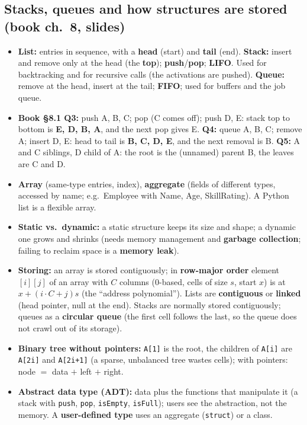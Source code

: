 \documentclass{fkt-notes}
\begin{document}
\subsection{Stacks, queues and how structures are stored (book ch.~8, slides)}
\begin{itemize}[nosep]
  \item \textbf{List:} entries in sequence, with a \textbf{head} (start) and \textbf{tail} (end).
        \textbf{Stack:} insert and remove only at the head (the \textbf{top}); \textbf{push}/\textbf{pop};
        \textbf{LIFO}. Used for backtracking and for recursive calls (the activations are pushed). \textbf{Queue:} remove at the head,
        insert at the tail; \textbf{FIFO}; used for buffers and the job queue.
  \item \textbf{Book \S8.1 Q3:} push A, B, C; pop (C comes off); push D, E: stack top to bottom is \textbf{E, D, B, A}, and the next pop gives E.
        \textbf{Q4:} queue A, B, C; remove A; insert D, E: head to tail is \textbf{B, C, D, E}, and the next removal is B.
        \textbf{Q5:} A and C siblings, D child of A: the root is the (unnamed) parent B, the leaves are C and D.
  \item \textbf{Array} (same-type entries, index), \textbf{aggregate} (fields of different types, accessed by name; e.g.\ Employee with
        Name, Age, SkillRating). A Python list is a flexible array.
  \item \textbf{Static vs.\ dynamic:} a static structure keeps its size and shape; a dynamic one grows and shrinks (needs memory
        management and \textbf{garbage collection}; failing to reclaim space is a \textbf{memory leak}).
  \item \textbf{Storing:} an array is stored contiguously; in \textbf{row-major order} element $[i][j]$ of an array with $C$ columns (0-based,
        cells of size $s$, start $x$) is at $x+(i\cdot C+j)s$ (the ``address polynomial''). Lists are \textbf{contiguous} or \textbf{linked}
        (head pointer, null at the end). Stacks are normally stored contiguously; queues as a \textbf{circular queue} (the first cell
        follows the last, so the queue does not crawl out of its storage).
  \item \textbf{Binary tree without pointers:} \texttt{A[1]} is the root, the children of \texttt{A[i]} are \texttt{A[2i]} and \texttt{A[2i+1]}
        (a sparse, unbalanced tree wastes cells); with pointers: node $=$ data $+$ left $+$ right.
  \item \textbf{Abstract data type (ADT):} data plus the functions that manipulate it (a stack with \texttt{push}, \texttt{pop}, \texttt{isEmpty},
        \texttt{isFull}); users see the abstraction, not the memory. A \textbf{user-defined type} uses an aggregate (\texttt{struct}) or a class.
\end{itemize}
\end{document}
